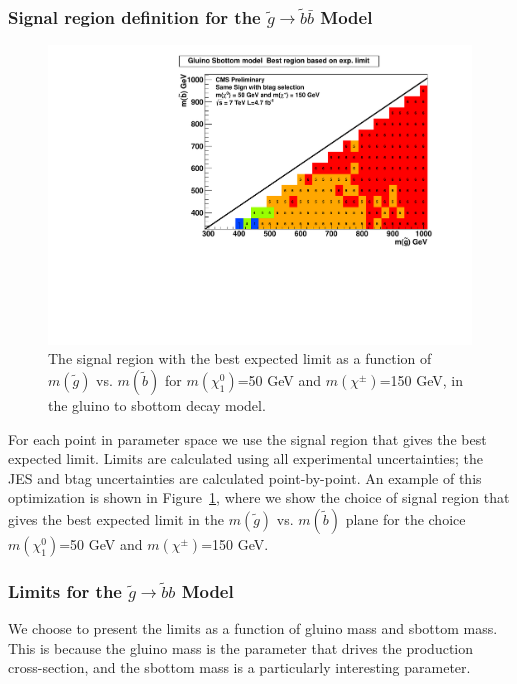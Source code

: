\subsubsection{Signal region definition for the $\widetilde{g} \to \widetilde{b}\bar{b}$ Model}
\label{sec:gbbdefinition}

\begin{figure}[htb]
\begin{center}
\includegraphics[width=0.49\linewidth]{figs/B2_BestSignalRegion_150.pdf}
\caption{The signal region with the best expected limit as a function of 
$m(\widetilde{g})$ vs. $m(\widetilde{b})$ for $m(\chi^0_1)$=50 GeV
and $m(\chi^{\pm})$=150 GeV, in the gluino to sbottom decay model.
\label{fig:gluinosboptimize}}
\end{center}
\end{figure}


For each point in parameter space we use the signal region that gives
the best expected limit.  
Limits are calculated using all experimental
uncertainties; the JES and btag uncertainties are calculated point-by-point.
An example of this optimization is shown in Figure~\ref{fig:gluinosboptimize},
where we show the choice of signal region that gives the best expected limit
in the $m(\widetilde{g})$ vs. $m(\widetilde{b})$ plane for the choice
$m(\chi^0_1)$=50 GeV and $m(\chi^{\pm})$=150 GeV. 



\subsubsection{Limits for the $\widetilde{g} \to \widetilde{b}b$ Model}
\label{sec:gbblimits}

We choose to present the limits as a function of gluino mass and
sbottom mass.  This is because the gluino mass is the parameter
that drives the production cross-section, and the sbottom mass
is a particularly interesting parameter.

